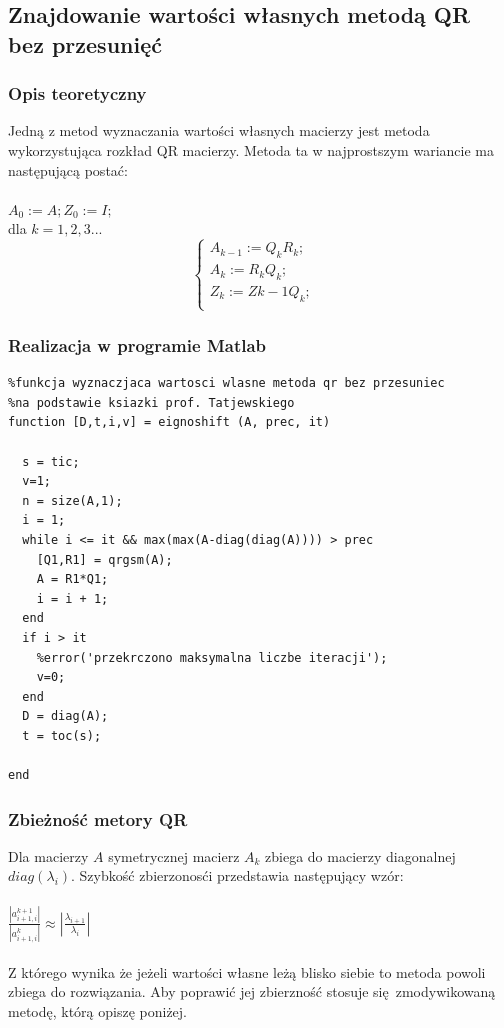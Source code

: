 \documentclass[a4paper, 11pt]{article}
\begin{document}
\subsection{Znajdowanie wartości własnych metodą QR bez przesunięć}
\subsubsection{Opis teoretyczny}
Jedną z metod wyznaczania wartości własnych macierzy jest metoda wykorzystująca rozkład QR macierzy. 
Metoda ta w najprostszym wariancie ma następującą postać:
\\
\\
\hspace{8cm}$A_{0} := A; Z_{0} := I;$
\\
\hspace{8cm}dla $k = 1,2,3...$
$$
\left\{ \begin{array}{ll}
A_{k-1} := Q_{k}R_{k};\\
A_{k} := R_{k}Q_{k}; & \\
Z_{k} := Z{k-1}Q_{k};& \\
\end{array} \right.
$$

\subsubsection{Realizacja w programie Matlab}
\begin{lstlisting}
%funkcja wyznaczjaca wartosci wlasne metoda qr bez przesuniec
%na podstawie ksiazki prof. Tatjewskiego
function [D,t,i,v] = eignoshift (A, prec, it)

  s = tic;
  v=1;
  n = size(A,1); 
  i = 1; 
  while i <= it && max(max(A-diag(diag(A)))) > prec
    [Q1,R1] = qrgsm(A);
    A = R1*Q1; 
    i = i + 1;
  end
  if i > it 
    %error('przekrczono maksymalna liczbe iteracji');
    v=0;
  end
  D = diag(A);  
  t = toc(s);

end
\end{lstlisting}

\subsubsection{Zbieżność metory QR}
Dla macierzy $A$ symetrycznej macierz $A_{k}$ zbiega do macierzy diagonalnej $diag(\lambda_{i})$. Szybkość zbierzonosći przedstawia następujący wzór:
\\
\\
$\frac{|a_{i+1,i}^{k+1}|}{|a_{i+1,i}^{k}|} \approx |\frac{\lambda_{i+1}}{\lambda_{i}}|$
\\
\\
Z którego wynika że jeżeli wartości własne leżą blisko siebie to metoda powoli zbiega do rozwiązania. Aby poprawić jej zbierzność stosuje się zmodywikowaną metodę, którą opiszę poniżej. 
\end{document}
